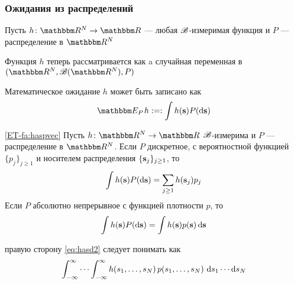 \begin{frame}\frametitle{Ожидания из распределений}

    \vspace{2em}
    Пусть $h \colon \RR^N \to \RR$ --- любая $\mathscr B$-измеримая функция и
    $P$ --- распределение в $\RR^N$
    
    Функция $h$ теперь рассматривается как a случайная переменная в 
    $(\RR^N, \bB(\RR^N), P)$
    
    Математическое ожидание $h$ может быть записано как
    \begin{equation}
        \label{eq:eph}
        \EEP h :=: \int h(\bolds) P(\diff \bolds)
    \end{equation}
    
\end{frame}

\begin{frame}

    \vspace{2em}
    \Fact\eqref{ET-fa:haspvec}
        Пусть $h \colon \RR^N \to \RR$ $\mathscr B$-измерима и $P$ ---
        распределение в $\RR^N$. Если $P$ дискретное, с вероятностной функцией $\{p_j\}_{j
        \geq 1}$ и носителем распределения $\{{\mathbf s}_j\}_{j \geq 1}$, то
        \begin{equation}
            \label{eq:hasp2}
            \int h({\mathbf s}) P(\mathop{}\!\mathrm{d} {\mathbf s}) = \sum_{j\geq 1} h({\mathbf s}_j) p_j 
        \end{equation}
        Если $P$ абсолютно непрерывное с функцией плотности $p$, то
        \begin{equation}
            \label{eq:hasd2}
            \int h({\mathbf s})P(\mathop{}\!\mathrm{d} {\mathbf s}) 
            = \int h({\mathbf s}) p({\mathbf s}) \mathop{}\!\mathrm{d} {\mathbf s}
    \end{equation}
    
    правую сторону \eqref{eq:hasd2} следует понимать как 
    \begin{equation*}
        \int_{-\infty}^\infty
            \cdots
            \int_{-\infty}^\infty
            h(s_1, \ldots, s_N) \,
            p(s_1,\ldots,s_N)  \,
            \mathop{}\!\mathrm{d} s_1 \cdots \mathop{}\!\mathrm{d} s_N
    \end{equation*}
\end{frame}

